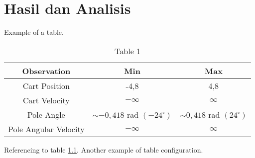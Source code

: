 \chapter{Hasil dan Analisis}

\lipsum[1] Example of a table.

\begin{table}[h!]
	\caption{Table 1}
	\label{tabref1}
	\centering
	\begin{tabular}{|c|c|c|}
		\hline
		Observation           & Min                             & Max                           \\
		\hline
		Cart Position         & -4,8                            & 4,8                           \\
		\hline
		Cart Velocity         & $-\infty$                       & $\infty$                      \\
		\hline
		Pole Angle            & $\sim -0,418$ rad $(-24^\circ)$ & $\sim 0,418$ rad $(24^\circ)$ \\
		\hline
		Pole Angular Velocity & $-\infty$                       & $\infty$                      \\
		\hline
	\end{tabular}
\end{table}

Referencing to table \ref{tabref1}. \lipsum[2] Another example of table configuration.


